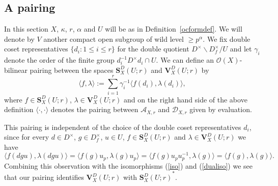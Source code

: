 \documentclass[a4paper, notitlepage]{amsart}
\newcommand{\OO}{\ensuremath{\mathscr{O}}\xspace}
\newcommand{\OC}{\ensuremath{\mathbf{S}^D_{X}(U;r)}\xspace}
\newcommand{\OCd}{\ensuremath{\mathbf{V}^D_{X}(U;r)}\xspace}
\begin{document}
\subsection{A pairing}
In this section $X$, $\kappa$, $r$, $\alpha$ and $U$ will be as in Definition~\ref{ocformdef}. We will denote by $V$ another compact open subgroup of wild level $\geq p^\alpha$. We fix double coset representatives $\{d_i : 1\leq i \leq r\}$ for the double quotient $D^\times \backslash D_f^\times / U$ and let $\gamma_i$ denote the order of the finite group $d_i^{-1}D^\times d_i \cap U$. We can define an $\OO(X)$-bilinear pairing between the spaces $\OC$ and $\OCd$ by
$$\langle f,\lambda \rangle:=\sum_{i=1}^r \gamma_i^{-1}\langle f(d_i), \lambda(d_i)\rangle,$$
where $f \in \OC$, $\lambda \in \OCd$ and on the right hand side of the above definition $\langle\cdot , \cdot \rangle$ denotes the pairing between $\mathscr{A}_{X,r}$ and $\mathscr{D}_{X,r}$ given by evaluation.

This pairing is independent of the choice of the double coset representatives $d_i$, since for every $d \in D^\times$, $g \in D^\times_f$, $u \in U$, $f\in \OC$ and $\lambda \in \OCd$ we have $$\langle f(dgu),\lambda(dgu)\rangle=\langle f(g)u_p,\lambda(g)u_p \rangle=\langle f(g)u_p u_p^{-1},\lambda(g)\rangle=\langle f(g),\lambda(g)\rangle.$$ Combining this observation with the isomorphisms (\ref{iso}) and (\ref{dualiso}) we see that our pairing identifies $\OCd$ with $\OC^*$.
\end{document}
